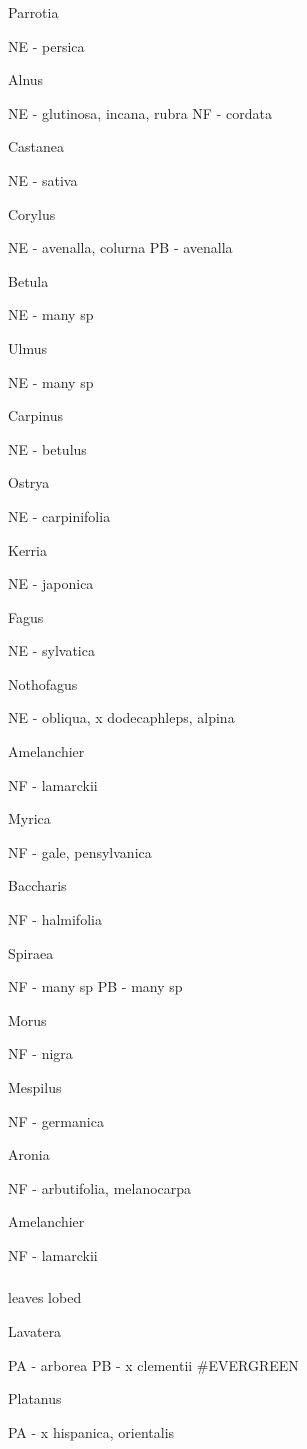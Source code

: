 \documentclass[openany]{book}
\begin{document}
Parrotia

NE - persica

Alnus

NE - glutinosa, incana, rubra NF - cordata

Castanea

NE - sativa

Corylus

NE - avenalla, colurna PB - avenalla

Betula

NE - many sp

Ulmus

NE - many sp

Carpinus

NE - betulus

Ostrya

NE - carpinifolia

Kerria

NE - japonica

Fagus

NE - sylvatica

Nothofagus

NE - obliqua, x dodecaphleps, alpina

Amelanchier

NF - lamarckii

Myrica

NF - gale, pensylvanica

Baccharis

NF - halmifolia

Spiraea

NF - many sp PB - many sp

Morus

NF - nigra

Mespilus

NF - germanica

Aronia

NF - arbutifolia, melanocarpa

Amelanchier

NF - lamarckii

\hypertarget{section-1}{%
\subsubsection{}\label{section-1}}

leaves lobed

Lavatera

PA - arborea PB - x clementii \#EVERGREEN

Platanus

PA - x hispanica, orientalis
\end{document}
